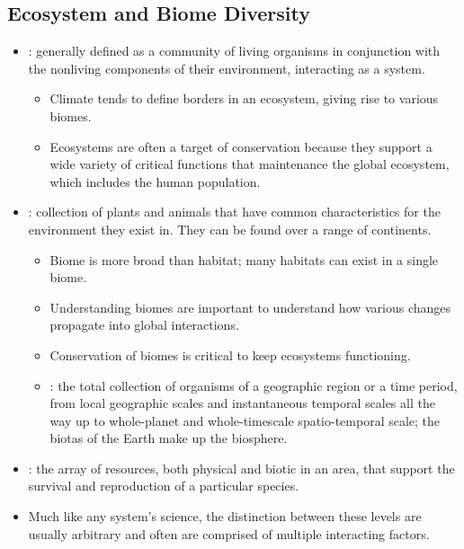 \documentclass{inVerba-notes}
\begin{document}
\begin{itemize}
    \subsection{Ecosystem and Biome Diversity}\label{Ecosystem and Biome Diversity}
    \begin{itemize}
        \item {}: generally defined as a community of living organisms in conjunction with the nonliving components of their environment, interacting as a system.
            \begin{itemize}
                \item Climate tends to define borders in an ecosystem, giving rise to various biomes.
                \item Ecosystems are often a target of conservation because they support a wide variety of critical functions that maintenance the global ecosystem, which includes the human population.
            \end{itemize}
        \item {}: collection of plants and animals that have common characteristics for the environment they exist in. They can be found over a range of continents. 
            \begin{itemize}
                \item Biome is more broad than habitat; many habitats can exist in a single biome.
                \item Understanding biomes are important to understand how various changes propagate into global interactions. 
                \item Conservation of biomes is critical to keep ecosystems functioning.
                \item {}: the total collection of organisms of a geographic region or a time period, from local geographic scales and instantaneous temporal scales all the way up to whole-planet and whole-timescale spatio-temporal scale; the biotas of the Earth make up the biosphere.
            \end{itemize}
        \item {}: the array of resources, both physical and biotic in an area, that support the survival and reproduction of a particular species. 
        \item Much like any system's science, the distinction between these levels are usually arbitrary and often are comprised of multiple interacting factors.
    \end{itemize}
\end{itemize}
\clearpage
\end{document}
